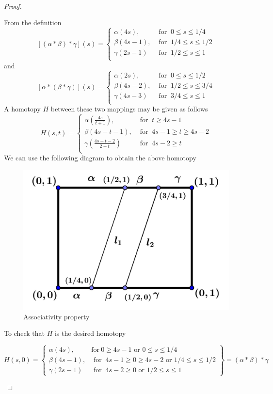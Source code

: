 \begin{proof}
\begin{description}
  From the definition
$$
[(\alpha\ast\beta)\ast\gamma](s)=
\begin{cases}
\alpha(4s),&\mbox{ for }\ 0\leq s\leq 1/4\\
\beta(4s-1),&\mbox{ for }\ 1/4\leq s\leq 1/2\\
\gamma(2s-1)&\mbox{ for }\ 1/2\leq s\leq 1\\
\end{cases}
$$
and
$$
[\alpha\ast(\beta\ast\gamma)](s)=
\begin{cases}
\alpha(2s),&\mbox{ for }\ 0\leq s\leq 1/2\\
\beta(4s-2),&\mbox{ for }\ 1/2\leq s\leq 3/4\\
\gamma(4s-3)&\mbox{ for }\ 3/4\leq s\leq 1\\
\end{cases}
$$
A homotopy $H$ between these two mappings may be given as follows
$$
H(s,t)=
\begin{cases}
\alpha(\frac{4s}{t+1}),&\mbox{ for }\ t\geq 4s-1\\
\beta(4s-t-1),&\mbox{ for }\ 4s-1\geq t\geq 4s-2\\
\gamma(\frac{4s-t-2}{2-t})&\mbox{ for }\ 4s-2\geq t\\
\end{cases}
$$
We can use the following diagram to obtain the above homotopy

\begin{figure}[hbt!]
\centering
\includegraphics[width=.6\textwidth]{./images/Asso.jpg}
\caption{Associativity property}
\end{figure}

To check that $H$ is the desired homotopy

\[
H(s,0)=\left\{\begin{array}{lr}
\alpha(4s),&\text{for}\ 0\geq 4s-1 \text{ or } 0\leq s\leq1/4 \\
\beta(4s-1),&\mbox{ for }\ 4s-1\geq 0\geq 4s-2 \text{ or } 1/4\leq s\leq1/2\\
\gamma(2s-1)&\mbox{ for }\ 4s-2\geq 0 \text{ or } 1/2\leq s\leq1
\end{array}\right\}=(\alpha\ast\beta)\ast\gamma
\]


\end{description}
\end{proof}
